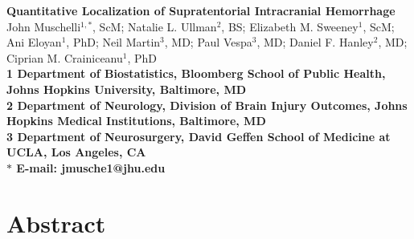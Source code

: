 \documentclass[12pt]{article}\usepackage[]{graphicx}\usepackage[]{color}
\date{}
\begin{document}
\begin{refsection} %
\thispagestyle{empty}

\newpage 
\begin{flushleft}
{\Large
\textbf{Quantitative Localization of Supratentorial Intracranial Hemorrhage}
}
\\
John Muschelli$^{1,\ast}$, ScM;
Natalie L. Ullman$^{2}$, BS;
Elizabeth M. Sweeney$^{1}$, ScM;
Ani Eloyan$^{1}$, PhD; 
Neil Martin$^{3}$, MD;
Paul Vespa$^{3}$, MD;
Daniel F. Hanley$^{2}$, MD;
Ciprian M. Crainiceanu$^{1}$, PhD
\\
\bf{1} Department of Biostatistics, Bloomberg School of Public Health, Johns Hopkins University, Baltimore, MD
\\
\bf{2} Department of Neurology, Division of Brain Injury Outcomes,  Johns Hopkins Medical Institutions, Baltimore, MD
\\
\bf{3} Department of Neurosurgery, David Geffen School of Medicine at UCLA, Los Angeles, CA
\\
$\ast$ E-mail: jmusche1@jhu.edu
\end{flushleft}



\newpage 






























\section*{Abstract}



\end{refsection}
\end{document}
